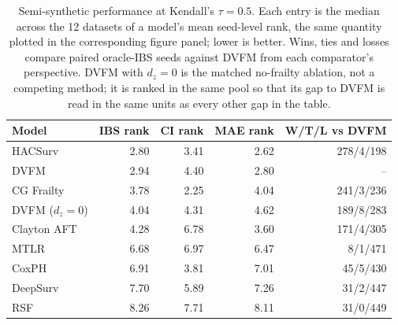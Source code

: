\begin{table}
\caption{Semi-synthetic performance at Kendall's $\tau=0.5$. Each entry is the median across the 12 datasets of a model's mean seed-level rank, the same quantity plotted in the corresponding figure panel; lower is better. Wins, ties and losses compare paired oracle-IBS seeds against DVFM from each comparator's perspective. DVFM with $d_z=0$ is the matched no-frailty ablation, not a competing method; it is ranked in the same pool so that its gap to DVFM is read in the same units as every other gap in the table.}
\label{tab:semi_synthetic_models_tau0p5}
\begin{tabular}{lrrrr}
\toprule
Model & IBS rank & CI rank & MAE rank & W/T/L vs DVFM \\
\midrule
HACSurv & 2.80 & 3.41 & 2.62 & 278/4/198 \\
DVFM & 2.94 & 4.40 & 2.80 & -- \\
CG Frailty & 3.78 & 2.25 & 4.04 & 241/3/236 \\
DVFM ($d_z{=}0$) & 4.04 & 4.31 & 4.62 & 189/8/283 \\
Clayton AFT & 4.28 & 6.78 & 3.60 & 171/4/305 \\
MTLR & 6.68 & 6.97 & 6.47 & 8/1/471 \\
CoxPH & 6.91 & 3.81 & 7.01 & 45/5/430 \\
DeepSurv & 7.70 & 5.89 & 7.26 & 31/2/447 \\
RSF & 8.26 & 7.71 & 8.11 & 31/0/449 \\
\bottomrule
\end{tabular}
\end{table}
